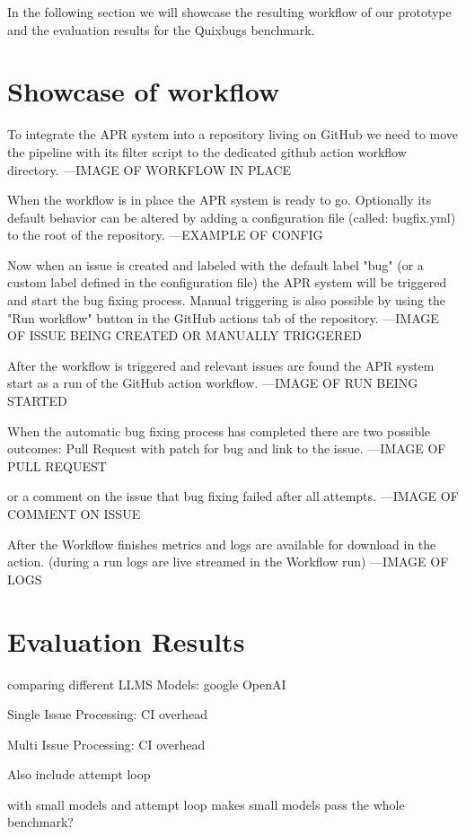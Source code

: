 
In the following section we will showcase the resulting workflow of our prototype and the evaluation results for the Quixbugs benchmark.
\section{Showcase of workflow}
To integrate the APR system into a repository living on GitHub we need to move the pipeline with its filter script to the dedicated github action workflow directory.
---IMAGE OF WORKFLOW IN PLACE

When the workflow is in place the APR system is ready to go. Optionally its default behavior can be altered by adding a configuration file (called: bugfix.yml) to the root of the repository.
---EXAMPLE OF CONFIG

Now when an issue is created and labeled with the default label "bug" (or a custom label defined in the configuration file) the APR system will be triggered and start the bug fixing process. Manual triggering is also possible by using the "Run workflow" button in the GitHub actions tab of the repository.
---IMAGE OF ISSUE BEING CREATED OR MANUALLY TRIGGERED

After the workflow is triggered and relevant issues are found the APR system start as a run of the GitHub action workflow.
---IMAGE OF RUN BEING STARTED


When the automatic bug fixing process has completed there are two possible outcomes:
Pull Request with patch for bug and link to the issue.
---IMAGE OF PULL REQUEST

or a comment on the issue that bug fixing failed after all attempts.
---IMAGE OF COMMENT ON ISSUE

After the Workflow finishes metrics and logs are available for download in the action.
(during a run logs are live streamed in the Workflow run)
---IMAGE OF LOGS

\section{Evaluation Results}
comparing different LLMS Models:
google
OpenAI

Single Issue Processing:
CI overhead

Multi Issue Processing:
CI overhead

Also include attempt loop

with small models and attempt loop makes small models pass the whole benchmark?